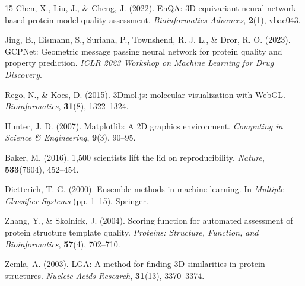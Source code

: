 \documentclass[10pt,twocolumn,a4paper]{article}
\begin{document}
\begin{thebibliography}{15}
Chen, X., Liu, J., \& Cheng, J. (2022).
EnQA: 3D equivariant neural network-based protein model quality assessment.
\textit{Bioinformatics Advances}, \textbf{2}(1), vbac043.

Jing, B., Eismann, S., Suriana, P., Townshend, R. J. L., \& Dror, R. O. (2023).
GCPNet: Geometric message passing neural network for protein quality and property prediction.
\textit{ICLR 2023 Workshop on Machine Learning for Drug Discovery}.

Rego, N., \& Koes, D. (2015).
3Dmol.js: molecular visualization with WebGL.
\textit{Bioinformatics}, \textbf{31}(8), 1322--1324.

Hunter, J. D. (2007).
Matplotlib: A 2D graphics environment.
\textit{Computing in Science \& Engineering}, \textbf{9}(3), 90--95.

Baker, M. (2016).
1,500 scientists lift the lid on reproducibility.
\textit{Nature}, \textbf{533}(7604), 452--454.

Dietterich, T. G. (2000).
Ensemble methods in machine learning.
In \textit{Multiple Classifier Systems} (pp. 1--15). Springer.

Zhang, Y., \& Skolnick, J. (2004).
Scoring function for automated assessment of protein structure template quality.
\textit{Proteins: Structure, Function, and Bioinformatics}, \textbf{57}(4), 702--710.

Zemla, A. (2003).
LGA: A method for finding 3D similarities in protein structures.
\textit{Nucleic Acids Research}, \textbf{31}(13), 3370--3374.

\end{thebibliography}
\end{document}
